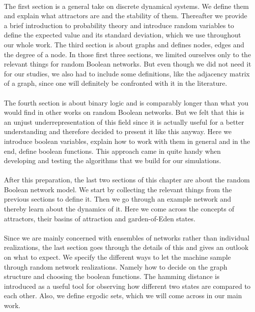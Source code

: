 \paragraph*{}
The first section is a general take on discrete dynamical systems. We define them and explain what attractors are and the stability of them. Thereafter we provide a brief introduction to probability theory and introduce random variables to define the expected value and its standard deviation, which we use throughout our whole work. The third section is about graphs and defines nodes, edges and the degree of a node. In those first three sections, we limited ourselves only to the relevant things for random Boolean networks. But even though we did not need it for our studies, we also had to include some definitions, like the adjacency matrix of a graph, since one will definitely be confronted with it in the literature.

\paragraph*{}
The fourth section is about binary logic and is comparably longer than what you would find in other works on random Boolean networks. But we felt that this is an unjust under\-representation of this field since it is actually useful for a better understanding and therefore decided to present it like this anyway. Here we introduce boolean variables, explain how to work with them in general and in the end, define boolean functions. This approach came in quite handy when developing and testing the algorithms that we build for our simulations.


\paragraph*{}
After this preparation, the last two sections of this chapter are about the random Boolean network model. We start by collecting the relevant things from the previous sections to define it. Then we go through an example network and thereby learn about the dynamics of it. Here we come across the concepts of attractors, their basins of attraction and garden-of-Eden states. 

\paragraph*{}
Since we are mainly concerned with ensembles of networks rather than individual realizations, the last section goes through the details of this and gives an outlook on what to expect. We specify the different ways to let the machine sample through random network realizations. Namely how to decide on the graph structure and choosing the boolean functions. The hamming distance is introduced as a useful tool for observing how different two states are compared to each other. Also, we define ergodic sets, which we will come across in our main work.

